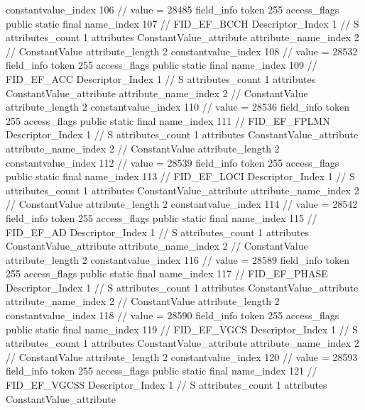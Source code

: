 {{{{{{{					constantvalue_index	106		// value = 28485
				}
				}
			}
			field_info {
				token	255
				access_flags	public static final
				name_index	107		// FID_EF_BCCH
				Descriptor_Index	1		// S
				attributes_count	1
				attributes {
				ConstantValue_attribute {
					attribute_name_index	2		// ConstantValue
					attribute_length	2
					constantvalue_index	108		// value = 28532
				}
				}
			}
			field_info {
				token	255
				access_flags	public static final
				name_index	109		// FID_EF_ACC
				Descriptor_Index	1		// S
				attributes_count	1
				attributes {
				ConstantValue_attribute {
					attribute_name_index	2		// ConstantValue
					attribute_length	2
					constantvalue_index	110		// value = 28536
				}
				}
			}
			field_info {
				token	255
				access_flags	public static final
				name_index	111		// FID_EF_FPLMN
				Descriptor_Index	1		// S
				attributes_count	1
				attributes {
				ConstantValue_attribute {
					attribute_name_index	2		// ConstantValue
					attribute_length	2
					constantvalue_index	112		// value = 28539
				}
				}
			}
			field_info {
				token	255
				access_flags	public static final
				name_index	113		// FID_EF_LOCI
				Descriptor_Index	1		// S
				attributes_count	1
				attributes {
				ConstantValue_attribute {
					attribute_name_index	2		// ConstantValue
					attribute_length	2
					constantvalue_index	114		// value = 28542
				}
				}
			}
			field_info {
				token	255
				access_flags	public static final
				name_index	115		// FID_EF_AD
				Descriptor_Index	1		// S
				attributes_count	1
				attributes {
				ConstantValue_attribute {
					attribute_name_index	2		// ConstantValue
					attribute_length	2
					constantvalue_index	116		// value = 28589
				}
				}
			}
			field_info {
				token	255
				access_flags	public static final
				name_index	117		// FID_EF_PHASE
				Descriptor_Index	1		// S
				attributes_count	1
				attributes {
				ConstantValue_attribute {
					attribute_name_index	2		// ConstantValue
					attribute_length	2
					constantvalue_index	118		// value = 28590
				}
				}
			}
			field_info {
				token	255
				access_flags	public static final
				name_index	119		// FID_EF_VGCS
				Descriptor_Index	1		// S
				attributes_count	1
				attributes {
				ConstantValue_attribute {
					attribute_name_index	2		// ConstantValue
					attribute_length	2
					constantvalue_index	120		// value = 28593
				}
				}
			}
			field_info {
				token	255
				access_flags	public static final
				name_index	121		// FID_EF_VGCSS
				Descriptor_Index	1		// S
				attributes_count	1
				attributes {
				ConstantValue_attribute {
}}}}}}}
